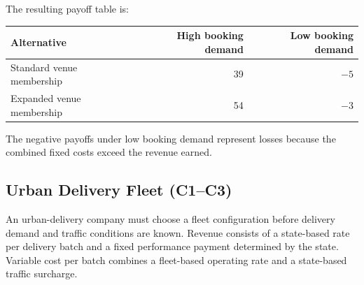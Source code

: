 The resulting payoff table is:

\begin{center}
	\begin{tabular}{lrr}
		\toprule
		Alternative & High booking demand & Low booking demand \\
		\midrule
		Standard venue membership & 39 & \(-5\) \\
		Expanded venue membership & 54 & \(-3\) \\
		\bottomrule
	\end{tabular}
\end{center}

The negative payoffs under low booking demand represent losses because the
combined fixed costs exceed the revenue earned.


\subsection{Urban Delivery Fleet (C1--C3)}
\label{sec:problem13-urban-delivery-fleet-c1-c3}

An urban-delivery company must choose a fleet configuration before delivery
demand and traffic conditions are known. Revenue consists of a state-based
rate per delivery batch and a fixed performance payment determined by the
state. Variable cost per batch combines a fleet-based operating rate and a
state-based traffic surcharge.

